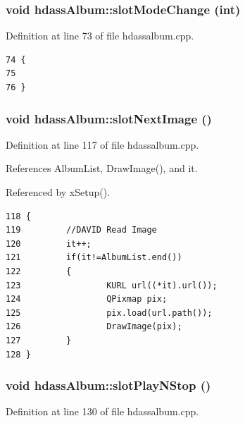 \subsubsection{\setlength{\rightskip}{0pt plus 5cm}void hdass\-Album::slot\-Mode\-Change (int)\hspace{0.3cm}{\tt  [slot]}}\label{classhdassAlbum_ImageDetiali7}




Definition at line 73 of file hdassalbum.cpp.



\footnotesize\begin{verbatim}74 {
75 
76 }
\end{verbatim}\normalsize 
{}
\subsubsection{\setlength{\rightskip}{0pt plus 5cm}void hdass\-Album::slot\-Next\-Image ()\hspace{0.3cm}{\tt  [slot]}}\label{classhdassAlbum_ImageDetiali4}




Definition at line 117 of file hdassalbum.cpp.

References Album\-List, Draw\-Image(), and it.

Referenced by x\-Setup().



\footnotesize\begin{verbatim}118 {
119         //DAVID Read Image
120         it++;
121         if(it!=AlbumList.end())
122         {
123                 KURL url((*it).url());
124                 QPixmap pix;
125                 pix.load(url.path());
126                 DrawImage(pix);
127         }
128 }
\end{verbatim}\normalsize 
{}
\subsubsection{\setlength{\rightskip}{0pt plus 5cm}void hdass\-Album::slot\-Play\-NStop ()\hspace{0.3cm}{\tt  [slot]}}\label{classhdassAlbum_ImageDetiali6}




Definition at line 130 of file hdassalbum.cpp.

